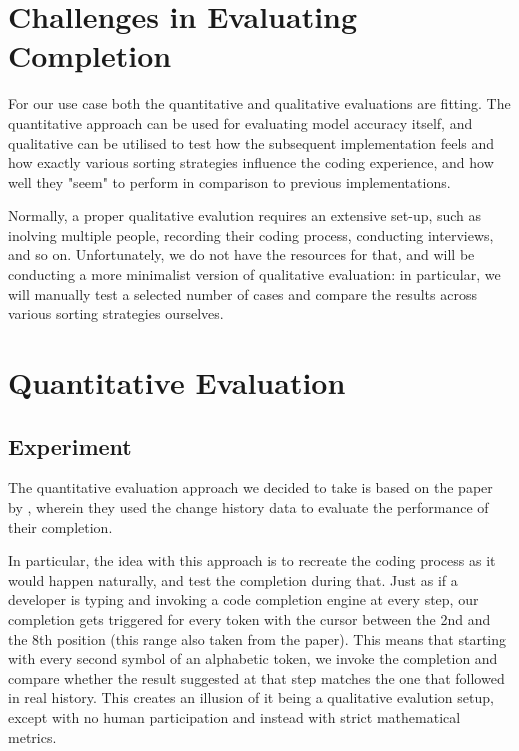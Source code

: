 \section{Challenges in Evaluating Completion}
\label{sec:Evaluation-Challenges}
For our use case both the quantitative and qualitative evaluations are fitting. The quantitative approach can be used for evaluating model accuracy itself, and qualitative can be utilised to test how the subsequent implementation feels and how exactly various sorting strategies influence the coding experience, and how well they "seem" to perform in comparison to previous implementations.

Normally, a proper qualitative evalution requires an extensive set-up, such as inolving multiple people, recording their coding process, conducting interviews, and so on. Unfortunately, we do not have the resources for that, and will be conducting a more minimalist version of qualitative evaluation: in particular, we will manually test a selected number of cases and compare the results across various sorting strategies ourselves.

\section{Quantitative Evaluation}
\label{sec:Evaluation-Quantitative}
\subsection{Experiment}
The quantitative evaluation approach we decided to take is based on the paper by \cite{Robb08a}, wherein they used the change history data to evaluate the performance of their completion.

In particular, the idea with this approach is to recreate the coding process as it would happen naturally, and test the completion during that. Just as if a developer is typing and invoking a code completion engine at every step, our completion gets triggered for every token with the cursor between the 2nd and the 8th position (this range also taken from the \cite{Robb08a} paper). This means that starting with every second symbol of an alphabetic token, we invoke the completion and compare whether the result suggested at that step matches the one that followed in real history. This creates an illusion of it being a qualitative evalution setup, except with no human participation and instead with strict mathematical metrics.

